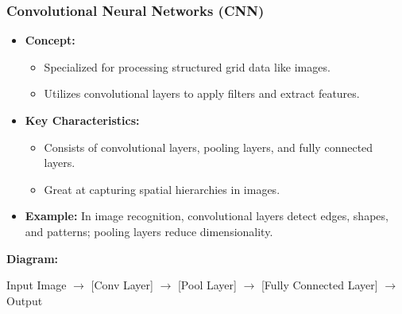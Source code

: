 \documentclass[aspectratio=169]{beamer}
\begin{document}
\begin{frame}[fragile]
  \frametitle{Convolutional Neural Networks (CNN)}
  \begin{itemize}
    \item \textbf{Concept:}
    \begin{itemize}
      \item Specialized for processing structured grid data like images.
      \item Utilizes convolutional layers to apply filters and extract features.
    \end{itemize}

    \item \textbf{Key Characteristics:}
    \begin{itemize}
      \item Consists of convolutional layers, pooling layers, and fully connected layers.
      \item Great at capturing spatial hierarchies in images.
    \end{itemize}

    \item \textbf{Example:}
    In image recognition, convolutional layers detect edges, shapes, and patterns; pooling layers reduce dimensionality.
  \end{itemize}

  \vspace{0.5cm}
  \textbf{Diagram:}
  \begin{center}
    Input Image $\rightarrow$ [Conv Layer] $\rightarrow$ [Pool Layer] $\rightarrow$ [Fully Connected Layer] $\rightarrow$ Output
  \end{center}
\end{frame}
\end{document}

